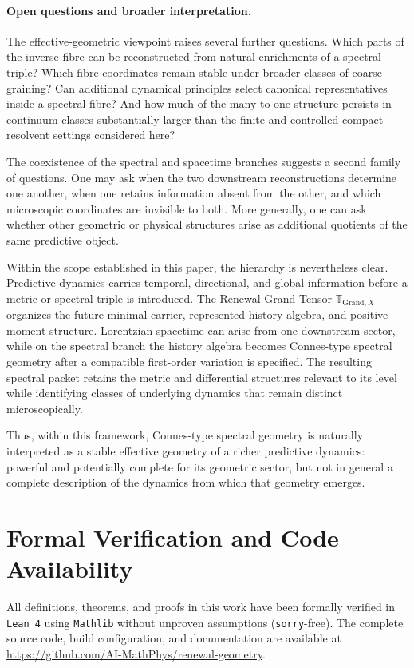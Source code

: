 \documentclass[11pt]{article}
\theoremstyle{definition}
\theoremstyle{remark}
\theoremstyle{definition}
\theoremstyle{remark}
\newcommand{\GTX}{\boldsymbol{\mathbb T}_{\mathrm{Grand},X}}
\begin{document}
\paragraph{Open questions and broader interpretation.}

The effective-geometric viewpoint raises several further questions.  Which parts
of the inverse fibre can be reconstructed from natural enrichments of a spectral
triple?  Which fibre coordinates remain stable under broader classes of
coarse graining?  Can additional dynamical principles select canonical
representatives inside a spectral fibre?  And how much of the many-to-one
structure persists in continuum classes substantially larger than the finite and
controlled compact-resolvent settings considered here?

The coexistence of the spectral and spacetime branches suggests a second family
of questions.  One may ask when the two downstream reconstructions determine one
another, when one retains information absent from the other, and which microscopic
coordinates are invisible to both.  More generally, one can ask whether other
geometric or physical structures arise as additional quotients of the same
predictive object.

Within the scope established in this paper, the hierarchy is nevertheless clear.
Predictive dynamics carries temporal, directional, and global information before
a metric or spectral triple is introduced.  The Renewal Grand Tensor $\GTX$
organizes the future-minimal carrier, represented history algebra, and positive
moment structure.  Lorentzian spacetime can arise from one downstream sector,
while on the spectral branch the history algebra becomes Connes-type spectral
geometry after a compatible first-order variation is specified.  The resulting
spectral packet retains the metric and differential structures relevant to its
level while identifying classes of underlying dynamics that remain distinct
microscopically.

Thus, within this framework, Connes-type spectral geometry is naturally
interpreted as a stable effective geometry of a richer predictive dynamics:
powerful and potentially complete for its geometric sector, but not in general a
complete description of the dynamics from which that geometry emerges.

\section*{Formal Verification and Code Availability}
All definitions, theorems, and proofs in this work have been formally verified in \texttt{Lean~4} using \texttt{Mathlib} without unproven assumptions (\texttt{sorry}-free). The complete source code, build configuration, and documentation are available at \url{https://github.com/AI-MathPhys/renewal-geometry}.
\end{document}

